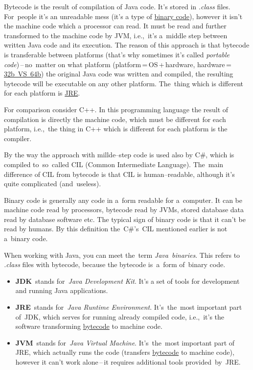\label{bytecode}
Bytecode is the result of compilation of Java code. It's stored in \textit{.class} files. For~people it's an unreadable mess (it's a type of \hyperref[bytecodebinarycode]{binary code}), however it isn't the machine code which a processor can read. It must be read and further transformed to the machine code by JVM, i.e.,~it's a~middle step between written Java code and its execution. The reason of this approach is that bytecode is transferable between platforms (that's why sometimes it's called \textit{portable code})\,--\,no~matter on what platform (platform\,=\,OS\,+\,hardware, hardware\,=\,\hyperref[32bvs64b]{32b~VS~64b}) the original Java code was written and compiled, the resulting bytecode will be executable on any other platform. The~thing which is different for each platform is \hyperref[jdkjrejvm]{JRE}.

For comparison consider C++. In this programming language the result of compilation is directly the machine code, which must be different for each platform, i.e.,~the thing in C++ which is different for each platform is the compiler.

By the way the approach with millde--step code is used also by C\#, which is compiled to~so~called CIL (Common Intermediate Language). The~main difference of CIL from bytecode is that CIL is human--readable, although it's quite complicated (and~useless).

\label{bytecodebinarycode}
Binary code is generally any code in a~form readable for a~computer. It can be machine code read by processors, bytecode read by JVMs, stored database data read by database software etc. The typical sign of binary code is that it can't be read by humans. By this definition the~C\#'s~CIL mentioned earlier is not a~binary code.

When working with Java, you can meet the~term \textit{Java~binaries}. This refers to \textit{.class} files with bytecode, because the bytecode is~a~form of~binary code.

\label{jdkjrejvm}
\begin{itemize}
    \item \textbf{JDK}~stands for~\textit{Java Development Kit}. It's a set of tools for development and running Java applications.
    \item \textbf{JRE}~stands for~\textit{Java Runtime Environment}. It's~the~most important part of~JDK, which serves for running already compiled code, i.e.,~it's the software transforming \hyperref[bytecode]{bytecode} to machine code.
    \item \textbf{JVM}~stands for~\textit{Java Virtual Machine}. It's~the~most important part of JRE, which actually runs the code (transfers \hyperref[bytecode]{bytecode} to machine code), however it can't work alone\,--\,it requires additional tools provided~by~JRE.
\end{itemize}

